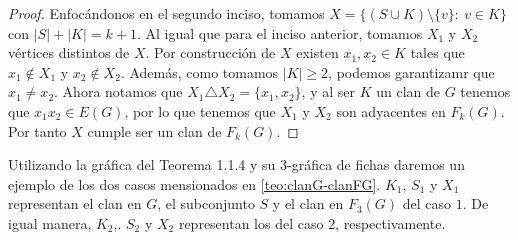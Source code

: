 \begin{proof}
        Enfoc\'andonos en el segundo inciso, tomamos $X = \{(S\cup K) \setminus
        \{v\}\colon\ v \in K \}$ con $|S| + |K| = k+1$. Al igual que para el inciso
        anterior, tomamos $X_1$ y $X_2$ v\'ertices distintos de $X$. Por
        construcci\'on de $X$ existen $x_1, x_2 \in K$ tales que $x_1 \notin
        X_1$ y $x_2 \notin X_2$. Adem\'as, como tomamos $|K| \geq 2$, podemos
        garantizamr que $x_1 \neq x_2$. Ahora notamos que $X_1 \triangle X_2 =
        \{x_1, x_2\}$, y al ser $K$ un clan de $G$ tenemos que $x_1x_2 \in
        E(G)$, por lo que tenemos que $X_1$ y $X_2$ son adyacentes en $F_k(G)$.
        Por tanto $X$ cumple ser un clan de $F_k(G)$.
    \end{proof}
    
    Utilizando la gr\'afica del Teorema 1.1.4 y su $3$-gr\'afica de fichas
    daremos un ejemplo de los dos casos mensionados en \cref{teo:clanG-clanFG}.
    $K_1$, $S_1$ y $X_1$ representan el clan en $G$, el subconjunto $S$ y el
    clan en $F_3(G)$ del caso $1$. De igual manera, $K_2$,. $S_2$ y $X_2$
    representan los del caso $2$, respectivamente.

